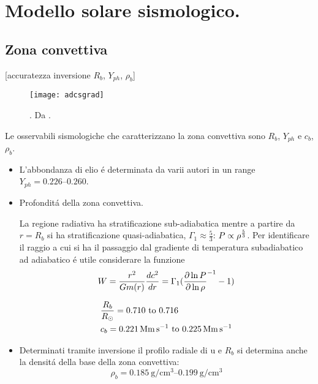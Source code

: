 \documentclass[../main.tex]{subfiles}
\begin{document}
\section{Modello solare sismologico.}


\subsection{Zona convettiva}

[accuratezza inversione $R_b$, $Y_{ph}$, $\rho_b$]

\begin{wrapfigure}[]{r}{0.4\textwidth}
\centering
\texttt{[image: adcsgrad]}
\caption{. Da \cite{christensen1991depth}.}
\end{wrapfigure}


Le osservabili sismologiche che caratterizzano la zona convettiva sono $R_b$, $Y_{ph}$ e $c_b$, $\rho_b$.

\begin{itemize}

\item L'abbondanza di elio \'e determinata da varii autori in un range $Y_{ph}=\numrange{0.226}{0.260}$.
    
\item Profondit\'a della zona convettiva.

La regione radiativa ha stratificazione sub-adiabatica mentre a partire da $r=R_b$ si ha stratificazione quasi-adiabatica,  $\Gamma_1\approx\frac{5}{3}$: $P\propto\rho\expy{\frac{5}{3}}$. Per identificare il raggio a cui si ha il passaggio dal gradiente di temperatura subadiabatico ad adiabatico \'e utile considerare la funzione
\begin{equation}
W=\frac{r^2}{Gm(r)}\TDy{r}{c^2}=\Gamma_1(\invers{\PDly{\rho}{P}}-1)
\end{equation}

    
\begin{align*}
&\frac{R_b}{\rsun{}}=\numrange{0.710}{0.716}\\
&c_b=\SIrange{0.221}{0.225}{\mega\meter\per\second}
\end{align*}

\item Determinati tramite inversione il profilo radiale di u e $R_b$ si determina anche la densit\'a della base della zona convettiva:
\begin{equation*}
\rho_b=\SIrange{0.185}{0.199}{\gram\per\cubic\cm}
\end{equation*}
    
\end{itemize}
\end{document}
